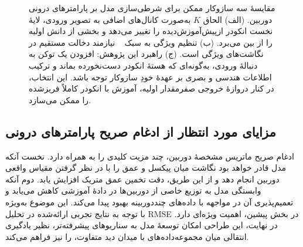 \begin{figure}[htbp]
    \caption[مقایسهٔ سه سازوکار ممکن برای شرطی‌سازی مدل بر پارامترهای دوربین]{مقایسهٔ
    سه سازوکار ممکن برای شرطی‌سازی مدل بر پارامترهای درونی دوربین.
    (الف) الحاق $K$ به‌صورت کانال‌های اضافی به تصویر ورودی، لایهٔ نخست انکودر
    ازپیش‌آموزش‌دیده را تغییر می‌دهد و بخشی از دانش اولیه را از بین می‌برد.
    (ب) تنظیم ویژگی به سبک ~\cite{Perez2018FiLM} نیازمند دخالت
    مستقیم در نگاشت‌های ویژگی است. (ج) راهبرد این پژوهش: افزودن یک توکن به
    دنبالهٔ ورودی، به‌گونه‌ای که هستهٔ انکودر دست‌نخورده بماند و ترکیب
    اطلاعات هندسی و بصری بر عهدهٔ خودِ سازوکار توجه باشد. این انتخاب، در کنار
    دروازهٔ خروجی صفرمقدار اولیه، آموزش با انکودر کاملاً فریزشده را ممکن
    می‌سازد.}
    \label{fig:conditioning_mechanisms}
\end{figure}

\subsection{مزایای مورد انتظار از ادغام صریح پارامترهای درونی}

ادغام صریح ماتریس مشخصهٔ دوربین، چند مزیت کلیدی را به همراه دارد. نخست آنکه مدل قادر خواهد بود نگاشت میان پیکسل و عمق را با در نظر گرفتن مقیاس واقعی دوربین انجام دهد و از این طریق، دقت تخمین عمق متریک افزایش یابد. دوم آنکه وابستگی مدل به توزیع خاصی از دوربین‌ها در دادهٔ آموزشی کاهش می‌یابد و تعمیم‌پذیری آن در مواجهه با داده‌های چنددوربینه بهبود پیدا می‌کند. این موضوع به‌ویژه با توجه به نتایج تجربی ارائه‌شده در تحلیل RMSE در بخش پیشین، اهمیت ویژه‌ای دارد. در نهایت، این طراحی امکان توسعهٔ مدل به سناریوهای پیشرفته‌تر، نظیر یادگیری انتقالی میان مجموعه‌داده‌های با میدان دید متفاوت، را نیز فراهم می‌کند.

